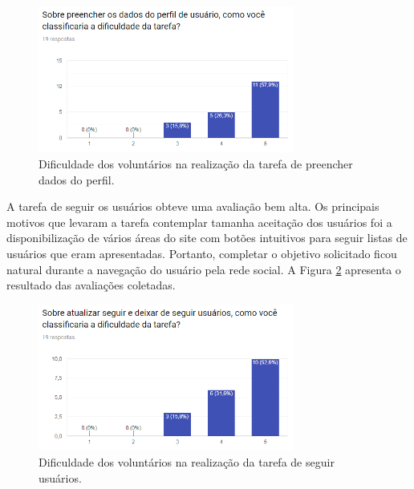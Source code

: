 \begin{figure}[H]
    \caption{Dificuldade dos voluntários na realização da tarefa de preencher dados do perfil.}
       	\begin{center}
            \includegraphics[width=0.75\textwidth]{figuras/avaliacao/pdv-2.png}
        \end{center}
    \label{avalGrafTUPreencherPerfil}
\end{figure} 

A tarefa de seguir os usuários obteve uma avaliação bem alta. Os principais motivos que levaram a tarefa contemplar tamanha aceitação dos usuários foi a disponibilização de vários áreas do site com botões intuitivos para seguir listas de usuários que eram apresentadas. Portanto, completar o objetivo solicitado ficou natural durante a navegação do usuário pela rede social. A Figura \ref{avalGrafTUSeguir} apresenta o resultado das avaliações coletadas.

\begin{figure}[h]
    \caption{Dificuldade dos voluntários na realização da tarefa de seguir usuários.}
       	\begin{center}
            \includegraphics[width=0.75\textwidth]{figuras/avaliacao/pdv-3.png}
        \end{center}
    \label{avalGrafTUSeguir}
\end{figure} 

